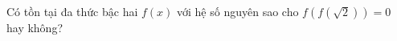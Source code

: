\ifshowproblem
\begin{problem}\label{example:RUS-2015-SMO-9-P1}
    Có tồn tại đa thức bậc hai \( f(x) \) với hệ số nguyên sao cho \( f(f(\sqrt{2})) = 0 \) hay không?
\end{problem}
\fi

\footnotemark
{}
\fi